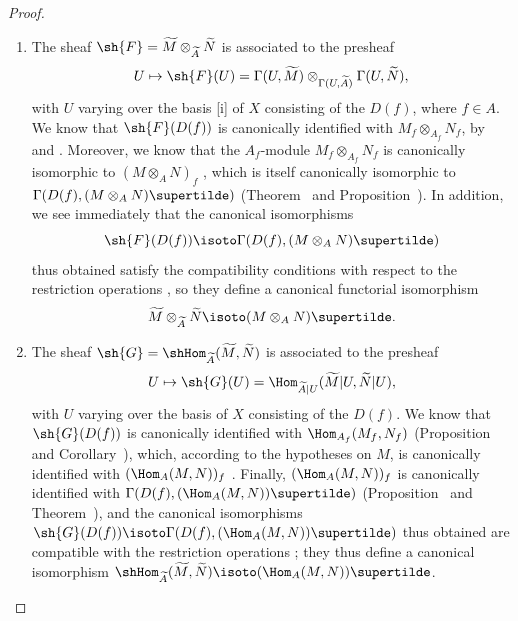 \begin{proof}
\medskip\noindent
\begin{enumerate}
  \item[(i)] The sheaf $\sh{F}=\widetilde{M}\otimes_{\widetilde{A}}\widetilde{N}$ is associated to the presheaf
    \[
      U\mapsto\sh{F}(U)=\Gamma(U,\widetilde{M})\otimes_{\Gamma(U,\widetilde{A})}\Gamma(U,\widetilde{N}),
    \]
    with $U$ varying over the basis [i] of $X$ consisting of the $D(f)$, where $f\in A$.
    We know that $\sh{F}(D(f))$ is canonically identified with $M_f\otimes_{A_f}N_f$, by  and .
    Moreover, we know that the $A_f$-module $M_f\otimes_{A_f}N_f$ is canonically
    isomorphic to $(M\otimes_A N)_f$ , which is itself canonically isomorphic to $\Gamma(D(f),(M\otimes_A N)\supertilde)$ (Theorem~ and Proposition~).
    In addition, we see immediately that the canonical isomorphisms
    \[
      \sh{F}(D(f))\isoto\Gamma(D(f),(M\otimes_A N)\supertilde)
    \]
    thus obtained satisfy the compatibility conditions with respect to the restriction operations , so they define a canonical functorial isomorphism
    \[
      \widetilde{M}\otimes_{\widetilde{A}}\widetilde{N}\isoto(M\otimes_A N)\supertilde.
    \]
  \item[(ii)] The sheaf $\sh{G}=\shHom_{\widetilde{A}}(\widetilde{M},\widetilde{N})$ is associated to the presheaf
    \[
      U\mapsto\sh{G}(U)=\Hom_{\widetilde{A}|U}(\widetilde{M}|U,\widetilde{N}|U),
    \]
    with $U$ varying over the basis of $X$ consisting of the $D(f)$.
    We know that $\sh{G}(D(f))$ is canonically identified with $\Hom_{A_f}(M_f,N_f)$ (Proposition~ and
    Corollary~), which, according to the hypotheses on $M$, is canonically identified with $(\Hom_A(M,N))_f$ .
    Finally, $(\Hom_A(M,N))_f$ is canonically identified with $\Gamma(D(f),(\Hom_A(M,N))\supertilde)$ (Proposition~ and Theorem~), and the canonical isomorphisms $\sh{G}(D(f))\isoto\Gamma(D(f),(\Hom_A(M,N))\supertilde)$ thus obtained are compatible with the restriction operations ;
    they thus define a canonical isomorphism $\shHom_{\widetilde{A}}(\widetilde{M},\widetilde{N})\isoto(\Hom_A(M,N))\supertilde$.
\end{enumerate}
\end{proof}

